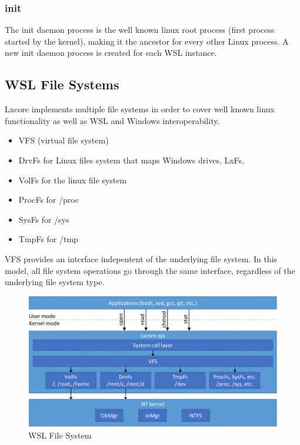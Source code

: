             \subsubsection{init}
            The init daemon process is the well known linux root process (first process started by the kernel), making it the ancestor for
            every other Linux process. A new init daemon process is created for each WSL instance.


        \subsection{WSL File Systems}
            Lxcore implements multiple file systems in order to cover well known linux functionality as well as WSL and Windows interoperability.


            \begin{itemize}
                \item VFS (virtual file system)
                \item DrvFs for Linux files system that maps Windows drives, LxFs, 
                \item VolFs for the linux file system
                \item ProcFs for /proc
                \item SysFs for /sys
                \item TmpFs for /tmp
            \end{itemize}

            VFS provides an interface indepentent of the underlying file system. In this model, all file system operations go through the
            same interface, regardless of the underlying file system type\cite{TheArtOfMemoryForensics}.

            \begin{figure}[H]
                \includegraphics[width=\linewidth]{img/wsl_file_system.png}
                \caption{WSL File System}
                \label{fig:wsl_file_system}
            \end{figure}

